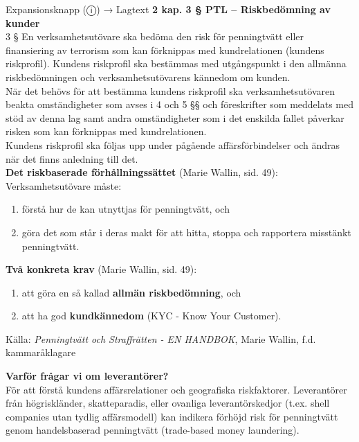 \documentclass[10pt]{beamer}
\begin{document}
\begin{frame}[label=riskfragor-steg2]
\begin{alertblock}{Expansionsknapp (ⓘ) → Lagtext}
    \tiny \textbf{2 kap. 3 § PTL – Riskbedömning av kunder}\\
    \tiny 3 §   En verksamhetsutövare ska bedöma den risk för penningtvätt eller finansiering
     av terrorism som kan förknippas med kundrelationen (kundens riskprofil). 
     Kundens riskprofil ska bestämmas med utgångspunkt i den allmänna riskbedömningen och 
     verksamhetsutövarens kännedom om kunden.\\

    \tiny När det behövs för att bestämma kundens riskprofil ska verksamhetsutövaren beakta
     omständigheter som avses i 4 och 5 §§ och föreskrifter som meddelats med stöd av denna 
     lag samt andra omständigheter som i det enskilda fallet påverkar risken som kan förknippas 
     med kundrelationen.\\

    \tiny Kundens riskprofil ska följas upp under pågående affärsförbindelser och ändras
     när det finns anledning till det.\\[0.1cm]
    
    \tiny \textbf{Det riskbaserade förhållningssättet} (Marie Wallin, sid. 49):\\
    \tiny Verksamhetsutövare måste:
    \begin{enumerate}
      \item förstå hur de kan utnyttjas för penningtvätt, och
      \item göra det som står i deras makt för att hitta, stoppa och rapportera misstänkt penningtvätt.
    \end{enumerate}
    \vspace{0.1cm}
    
    \tiny \textbf{Två konkreta krav} (Marie Wallin, sid. 49):\\
    \begin{enumerate}
      \item att göra en så kallad \textbf{allmän riskbedömning}, och
      \item att ha god \textbf{kundkännedom} (KYC - Know Your Customer).
    \end{enumerate}
    \tiny Källa: \textit{Penningtvätt och Straffrätten - EN HANDBOK}, Marie Wallin, f.d. kammaråklagare
    \vspace{0.1cm}
    
    \tiny \textbf{Varför frågar vi om leverantörer?}\\
    \tiny För att förstå kundens affärsrelationer och geografiska riskfaktorer. 
     Leverantörer från högriskländer, skatteparadis, eller ovanliga leverantörskedjor 
     (t.ex. shell companies utan tydlig affärsmodell) kan indikera förhöjd risk för penningtvätt 
     genom handelsbaserad penningtvätt (trade-based money laundering).\\[0.1cm]
  \end{alertblock}


\end{frame}
\end{document}
